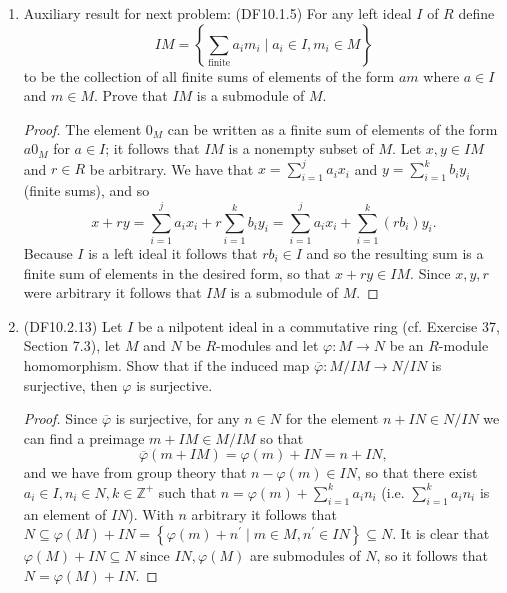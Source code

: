\documentclass[11pt]{article}
\newcommand{\cbr}[1]{\left\{#1\right\}}
\begin{document}
\begin{enumerate}
\begin{enumerate}[label=\textbf{(\alph*)}]
\begin{proof}
        So suppose $m$ is not a torsion element, meaning that there are no nonzero elements $t\in R$ such that $tm = 0$. Then we consider the element $rm$, which will not be zero since $r\neq 0_R$ and $m$ is not a torsion element. We have $s(rm) = (sr)m = 0_Rm = 0$, and with $s\neq 0_R$ we have that $rm$ is a nonzero torsion element.
      \end{proof}
    \end{enumerate}
    In these exercises $R$ is a ring with $1$ and $M$ is a left $R$-module.
    \item Auxiliary result for next problem: (DF10.1.5) For any left ideal $I$ of $R$ define \[IM = \cbr{\sum_{\text{finite}}a_im_i\mid a_i\in I, m_i\in M}\] to be the collection of all finite sums of elements of the form $am$ where $a\in I$ and $m\in M$. Prove that $IM$ is a submodule of $M$. \begin{proof}
      The element $0_M$ can be written as a finite sum of elements of the form $a0_M$ for $a\in I$; it follows that $IM$ is a nonempty subset of $M$. Let $x,y\in IM$ and $r\in R$ be arbitrary. We have that $x = \sum_{i=1}^j a_ix_i$ and $y = \sum_{i=1}^k b_iy_i$ (finite sums), and so \[x+ry = \sum_{i=1}^j a_ix_i + r\sum_{i=1}^k b_iy_i = \sum_{i=1}^j a_ix_i + \sum_{i=1}^k (rb_i)y_i.\] Because $I$ is a left ideal it follows that $rb_i\in I$ and so the resulting sum is a finite sum of elements in the desired form, so that $x+ry\in IM$. Since $x,y,r$ were arbitrary it follows that $IM$ is a submodule of $M$.
    \end{proof}
    \item (DF10.2.13) Let $I$ be a nilpotent ideal in a commutative ring (cf. Exercise 37, Section 7.3), let $M$ and $N$ be $R$-modules and let $\varphi\colon M\to N$ be an $R$-module homomorphism. Show that if the induced map $\overline{\varphi}\colon M/IM \to N/IN$ is surjective, then $\varphi$ is surjective. \begin{proof}
      Since $\overline{\varphi}$ is surjective, for any $n\in N$ for the element $n + IN\in N/IN$ we can find a preimage $m+IM\in M/IM$ so that \[\overline{\varphi}(m+IM) = \varphi(m) + IN = n+IN,\] and we have from group theory that $n-\varphi(m)\in IN$, so that there exist $a_i\in I,n_i\in N, k\in \mathbb{Z}^+$ such that $n = \varphi(m) + \sum_{i = 1}^ka_in_i$ (i.e. $\sum_{i = 1}^ka_in_i$ is an element of $IN$). With $n$ arbitrary it follows that $N\subseteq \varphi(M) + IN  = \cbr{\varphi(m) + n^{\prime}\mid m\in M, n^{\prime}\in IN}\subseteq N$. It is clear that $\varphi(M) + IN \subseteq N$ since $IN,\varphi(M)$ are submodules of $N$, so it follows that $N = \varphi(M) + IN$. 


\end{proof}
\end{enumerate}
\end{document}
